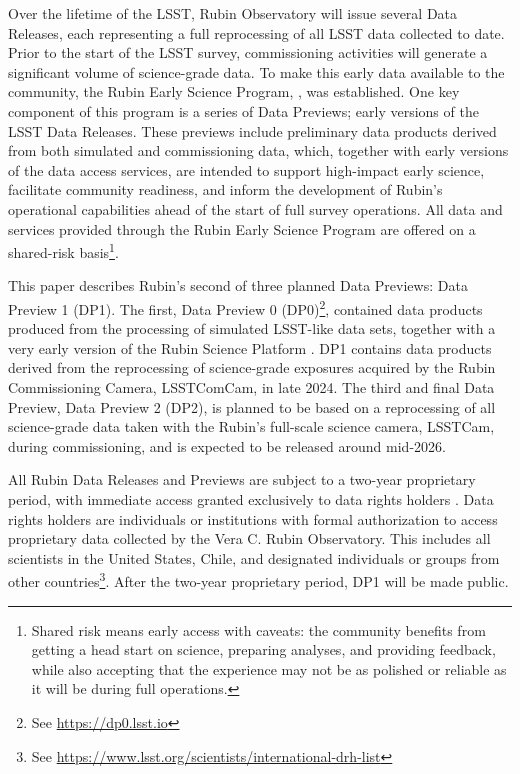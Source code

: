 Over the lifetime of the LSST, Rubin Observatory will issue several Data Releases, each representing a full reprocessing of all LSST data collected to date. 
Prior to the start of the LSST survey, commissioning activities will generate a significant volume of science-grade data. 
To make this early data available to the community, the Rubin Early Science Program, \citep{RTN-011}, was established. 
One key component of this program is a series of Data Previews; early versions of the LSST Data Releases.
These previews include preliminary data products derived from both simulated and commissioning data, which, together with early versions of the data access services, are intended to support high-impact early science, facilitate community readiness, and inform the development of Rubin’s operational capabilities ahead of the start of full survey operations.
All data and services provided through the Rubin Early Science Program are offered on a shared-risk basis\footnote{Shared risk means early access with caveats: the community benefits from getting a head start on science, preparing analyses, and providing feedback, while also accepting that the experience may not be as polished or reliable as it will be during full operations.}.

This paper describes Rubin's second of three planned Data Previews: Data Preview 1 (DP1).
The first, Data Preview 0 (DP0)\footnote{See \url{https://dp0.lsst.io}}, contained data products produced from the processing of simulated LSST-like data sets, together with a very early version of the Rubin Science Platform \citep{LSE-319}. 
DP1 contains data products derived from the reprocessing of science-grade exposures acquired by the Rubin Commissioning Camera, LSSTComCam, in late 2024.
The third and final Data Preview,  Data Preview 2 (DP2), is planned to be based on a reprocessing of all science-grade data taken with the Rubin's full-scale science camera, LSSTCam, during commissioning, and is expected to be released around mid-2026.

All Rubin Data Releases and Previews are subject to a two-year proprietary period, with immediate access granted exclusively to data rights holders \citep{rdo-013}. 
Data rights holders are individuals or institutions with formal authorization to access proprietary data collected by the Vera C. Rubin Observatory. 
This includes all scientists in the United States, Chile, and designated individuals or groups from other countries\footnote{See \url{https://www.lsst.org/scientists/international-drh-list}}.
After the two-year proprietary period, DP1 will be made public.

